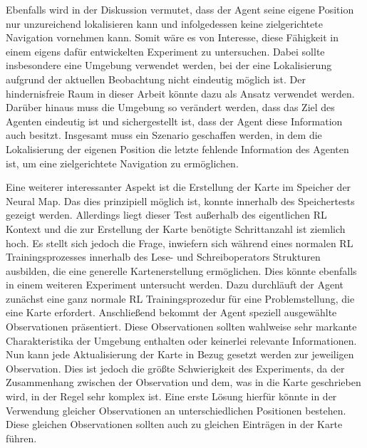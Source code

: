 Ebenfalls wird in der Diskussion vermutet, dass der Agent seine eigene Position nur unzureichend lokalisieren kann und infolgedessen keine zielgerichtete Navigation vornehmen kann. Somit wäre es von Interesse, diese Fähigkeit in einem eigens dafür entwickelten Experiment zu untersuchen. Dabei sollte insbesondere eine Umgebung verwendet werden, bei der eine Lokalisierung aufgrund der aktuellen Beobachtung nicht eindeutig möglich ist. Der hindernisfreie Raum in dieser Arbeit könnte dazu als Ansatz verwendet werden. Darüber hinaus muss die Umgebung so verändert werden, dass das Ziel des Agenten eindeutig ist und sichergestellt ist, dass der Agent diese Information auch besitzt. Insgesamt muss ein Szenario geschaffen werden, in dem die Lokalisierung der eigenen Position die letzte fehlende Information des Agenten ist, um eine zielgerichtete Navigation zu ermöglichen.

Eine weiterer interessanter Aspekt ist die Erstellung der Karte im Speicher der Neural Map. Das dies prinzipiell möglich ist, konnte innerhalb des Speichertests gezeigt werden. Allerdings liegt dieser Test außerhalb des eigentlichen RL Kontext und die zur Erstellung der Karte benötigte Schrittanzahl ist ziemlich hoch. Es stellt sich jedoch die Frage, inwiefern sich während eines normalen RL Trainingsprozesses innerhalb des Lese- und Schreiboperators Strukturen ausbilden, die eine generelle Kartenerstellung ermöglichen. Dies könnte ebenfalls in einem weiteren Experiment untersucht werden. Dazu durchläuft der Agent zunächst eine ganz normale RL Trainingsprozedur für eine Problemstellung, die eine Karte erfordert. Anschließend bekommt der Agent speziell ausgewählte Observationen präsentiert. Diese Observationen sollten wahlweise sehr markante Charakteristika der Umgebung enthalten oder keinerlei relevante Informationen. Nun kann jede Aktualisierung der Karte in Bezug gesetzt werden zur jeweiligen Observation. Dies ist jedoch die größte Schwierigkeit des Experiments, da der Zusammenhang zwischen der Observation und dem, was in die Karte geschrieben wird, in der Regel sehr komplex ist. Eine erste Lösung hierfür könnte in der Verwendung gleicher Observationen an unterschiedlichen Positionen bestehen. Diese gleichen Observationen sollten auch zu gleichen Einträgen in der Karte führen.
